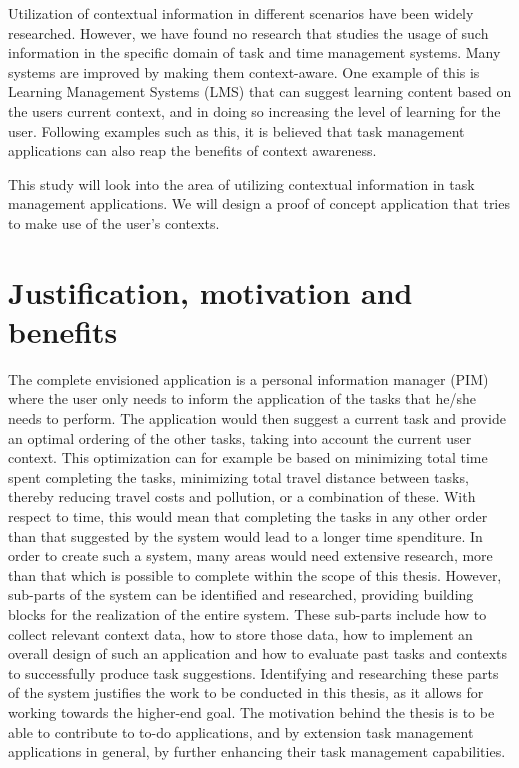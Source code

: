 Utilization of contextual information in different scenarios have been widely researched. However, we have found no research that studies the usage of such information in the specific domain of task and time management systems. Many systems are improved by making them context-aware. One example of this is Learning Management Systems (LMS) that can suggest learning content based on the users current context\cite{verbert2012context}, and in doing so increasing the level of learning for the user. Following examples such as this, it is believed that task management applications can also reap the benefits of context awareness.

This study will look into the area of utilizing contextual information in task management applications. We will design a proof of concept application that tries to make use of the user's contexts.

\section{Justification, motivation and benefits}
The complete envisioned application is a personal information manager (PIM) where the user only needs to inform the application of the tasks that he/she needs to perform. The application would then suggest a current task and provide an optimal ordering of the other tasks, taking into account the current user context. This optimization can for example be based on minimizing total time spent completing the tasks, minimizing total travel distance between tasks, thereby reducing travel costs and pollution, or a combination of these. With respect to time, this would mean that completing the tasks in any other order than that suggested by the system would lead to a longer time spenditure. In order to create such a system, many areas would need extensive research, more than that which is possible to complete within the scope of this thesis. However, sub-parts of the system can be identified and researched, providing building blocks for the realization of the entire system. These sub-parts include how to collect relevant context data, how to store those data, how to implement an overall design of such an application and how to evaluate past tasks and contexts to successfully produce task suggestions. Identifying and researching these parts of the system justifies the work to be conducted in this thesis, as it allows for working towards the higher-end goal. The motivation behind the thesis is to be able to contribute to to-do applications, and by extension task management applications in general, by further enhancing their task management capabilities.



